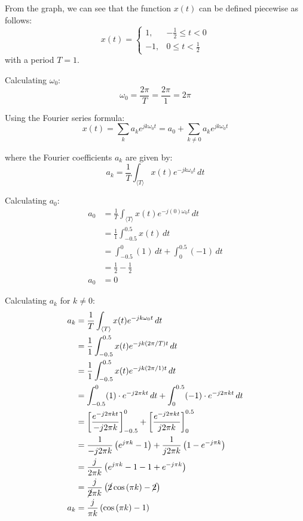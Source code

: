 \documentclass[a4paper, 10pt]{article}
\begin{document}
\begin{solution}
From the graph, we can see that the function \( x(t) \) can be defined piecewise as follows:
\[
x(t) =
\begin{cases}
1, & -\frac{1}{2} \leq t < 0 \\
-1, & 0 \leq t < \frac{1}{2}
\end{cases}
\]
with a period \( T = 1 \).

\vspace{2mm}

Calculating \( \omega_0 \):
\[ \omega_0 = \frac{2 \pi}{T} = \frac{2 \pi}{1} = 2\pi \]

Using the Fourier series formula:
\[ x(t) = \sum_{k} a_k e^{j k \omega_0 t} = a_0 + \sum_{k \neq 0} a_k e^{j k \omega_0 t} \]

where the Fourier coefficients \( a_k \) are given by:
\[ a_k = \frac{1}{T} \int_{\langle T \rangle} x(t) e^{-j k \omega_0 t} \,dt \]

Calculating \( a_0 \):
\begin{align*}
    a_0 &= \frac{1}{T} \int_{\langle T \rangle} x(t) e^{-j (0) \omega_0 t} \,dt \\
    &= \frac{1}{1} \int_{-0.5}^{0.5} x(t) \,dt \\
    &= \int_{-0.5}^{0} (1) \,dt + \int_{0}^{0.5} (-1) \,dt \\
    &= \frac{1}{2} - \frac{1}{2} \\
    a_0 &= 0
\end{align*}

\newpage

Calculating \( a_k \) for \( k \neq 0 \):
\begin{align*}
    a_k &= \frac{1}{T} \int_{\langle T \rangle} x(t) e^{-j k \omega_0 t} \,dt \\
    &= \frac{1}{1} \int_{-0.5}^{0.5} x(t) e^{-j k (2 \pi / T) t} \,dt \\
    &= \frac{1}{1} \int_{-0.5}^{0.5} x(t) e^{-j k (2 \pi / 1) t} \,dt \\
    &= \int_{-0.5}^{0} (1) \cdot e^{-j 2 \pi k t} \,dt + \int_{0}^{0.5} (-1) \cdot e^{-j 2 \pi k t} \,dt \\
    &= \left[ \frac{e^{-j 2 \pi k t}}{-j 2 \pi k} \right]_{-0.5}^{0} + \left[ \frac{e^{-j 2 \pi k t}}{j 2 \pi k} \right]_{0}^{0.5} \\
    &= \frac{1}{-j 2 \pi k} \left( e^{j \pi k} - 1 \right) + \frac{1}{j 2 \pi k} \left( 1 - e^{-j \pi k} \right) \\
    &= \frac{j}{2\pi k} \left( e^{j \pi k} - 1 - 1 + e^{-j \pi k} \right) \\
    &= \frac{j}{\cancel{2}\pi k} \left( \cancel{2} \cos{(\pi k)} - \cancel{2} \right) \\
    a_k &= \frac{j}{\pi k} \left( \cos{(\pi k)} - 1 \right)
\end{align*}


\end{solution}
\end{document}
